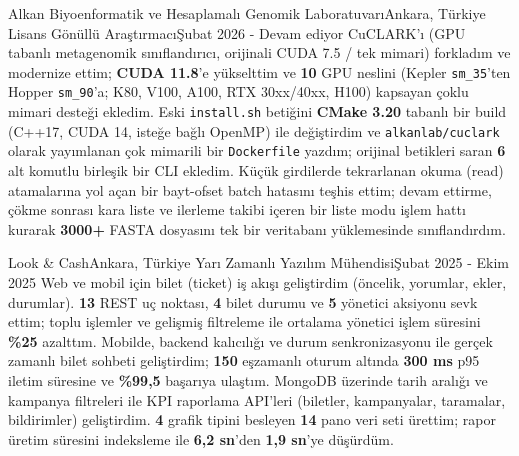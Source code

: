     \resumeSubheading
  {Alkan Biyoenformatik ve Hesaplamalı Genomik Laboratuvarı}{Ankara, Türkiye}
  {Lisans Gönüllü Araştırmacı}{Şubat 2026 - Devam ediyor}
  \resumeItemListStart
        {CuCLARK'ı (GPU tabanlı metagenomik sınıflandırıcı, orijinali CUDA 7.5 / tek mimari) forkladım ve modernize ettim; \textbf{CUDA 11.8}'e yükselttim ve \textbf{10} GPU neslini (Kepler \texttt{sm\_35}'ten Hopper \texttt{sm\_90}'a; K80, V100, A100, RTX 30xx/40xx, H100) kapsayan çoklu mimari desteği ekledim.}
        {Eski \texttt{install.sh} betiğini \textbf{CMake 3.20} tabanlı bir build (C++17, CUDA 14, isteğe bağlı OpenMP) ile değiştirdim ve \texttt{alkanlab/cuclark} olarak yayımlanan çok mimarili bir \texttt{Dockerfile} yazdım; orijinal betikleri saran \textbf{6} alt komutlu birleşik bir CLI ekledim.}
        {Küçük girdilerde tekrarlanan okuma (read) atamalarına yol açan bir bayt-ofset batch hatasını teşhis ettim; devam ettirme, çökme sonrası kara liste ve ilerleme takibi içeren bir liste modu işlem hattı kurarak \textbf{3000+} FASTA dosyasını tek bir veritabanı yüklemesinde sınıflandırdım.}
    \resumeItemListEnd

    \resumeSubheading
  {Look \& Cash}{Ankara, Türkiye}
  {Yarı Zamanlı Yazılım Mühendisi}{Şubat 2025 - Ekim 2025}
  \resumeItemListStart
        {Web ve mobil için bilet (ticket) iş akışı geliştirdim (öncelik, yorumlar, ekler, durumlar). \textbf{13} REST uç noktası, \textbf{4} bilet durumu ve \textbf{5} yönetici aksiyonu sevk ettim; toplu işlemler ve gelişmiş filtreleme ile ortalama yönetici işlem süresini \textbf{\%25} azalttım.}
        {Mobilde, backend kalıcılığı ve durum senkronizasyonu ile gerçek zamanlı bilet sohbeti geliştirdim; \textbf{150} eşzamanlı oturum altında \textbf{300 ms} p95 iletim süresine ve \textbf{\%99,5} başarıya ulaştım.}
        {MongoDB üzerinde tarih aralığı ve kampanya filtreleri ile KPI raporlama API'leri (biletler, kampanyalar, taramalar, bildirimler) geliştirdim. \textbf{4} grafik tipini besleyen \textbf{14} pano veri seti ürettim; rapor üretim süresini indeksleme ile \textbf{6,2 sn}'den \textbf{1,9 sn}'ye düşürdüm.}
    \resumeItemListEnd

  \resumeSubHeadingListEnd


